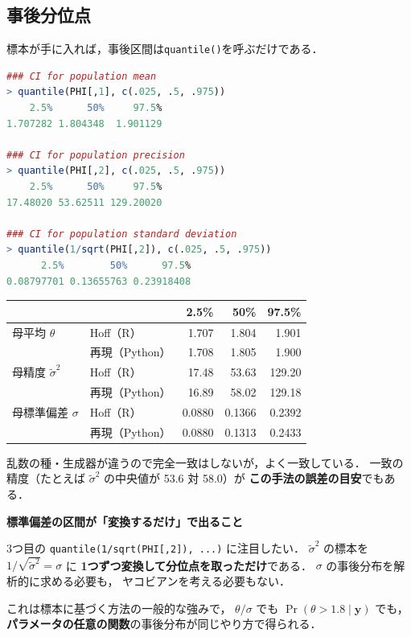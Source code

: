 \documentclass[lualatex,ja=standard,a4paper,12pt]{bxjsarticle}
\begin{document}
\subsection*{事後分位点}

標本が手に入れば，事後区間は\texttt{quantile()}を呼ぶだけである．

\begin{lstlisting}[language=R]
### CI for population mean
> quantile(PHI[,1], c(.025, .5, .975))
    2.5%      50%     97.5%
1.707282 1.804348  1.901129

### CI for population precision
> quantile(PHI[,2], c(.025, .5, .975))
    2.5%      50%     97.5%
17.48020 53.62511 129.20020

### CI for population standard deviation
> quantile(1/sqrt(PHI[,2]), c(.025, .5, .975))
      2.5%        50%      97.5%
0.08797701 0.13655763 0.23918408
\end{lstlisting}

\begin{center}
\renewcommand{\arraystretch}{1.4}
\begin{tabular}{llrrr}
\toprule
 & & 2.5\% & 50\% & 97.5\% \\
\midrule
母平均 $\theta$ & Hoff（R） & 1.707 & 1.804 & 1.901 \\
                & 再現（Python） & 1.708 & 1.805 & 1.900 \\
\midrule
母精度 $\tilde{\sigma}^2$ & Hoff（R） & 17.48 & 53.63 & 129.20 \\
                & 再現（Python） & 16.89 & 58.02 & 129.18 \\
\midrule
母標準偏差 $\sigma$ & Hoff（R） & 0.0880 & 0.1366 & 0.2392 \\
                & 再現（Python） & 0.0880 & 0.1313 & 0.2433 \\
\bottomrule
\end{tabular}
\end{center}

\noindent 乱数の種・生成器が違うので完全一致はしないが，よく一致している．
一致の精度（たとえば $\tilde{\sigma}^2$ の中央値が 53.6 対 58.0）が
\textbf{この手法の誤差の目安}でもある．

\begin{pointbox}
\textbf{標準偏差の区間が「変換するだけ」で出ること}

3つ目の \texttt{quantile(1/sqrt(PHI[,2]), ...)} に注目したい．
$\tilde{\sigma}^2$ の標本を $1/\sqrt{\tilde{\sigma}^2} = \sigma$ に
\textbf{1つずつ変換して分位点を取っただけ}である．
$\sigma$ の事後分布を解析的に求める必要も，
ヤコビアンを考える必要もない．

\medskip
これは標本に基づく方法の一般的な強みで，
$\theta/\sigma$ でも $\Pr(\theta > 1.8 \mid \boldsymbol{y})$ でも，
\textbf{パラメータの任意の関数}の事後分布が同じやり方で得られる．
\end{pointbox}
\end{document}
